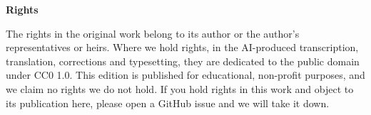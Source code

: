 \documentclass[11pt,oneside]{article}
\begin{document}
\bigskip
\noindent\textbf{Rights}

\smallskip
\noindent The rights in the original work belong to its author or the author's representatives or heirs. Where we
hold rights, in the AI-produced transcription, translation, corrections and typesetting, they are dedicated to the
public domain under CC0 1.0. This edition is published for educational, non-profit purposes, and we claim no rights we
do not hold. If you hold rights in this work and object to its publication here, please open a GitHub issue and we will
take it down.
\clearpage
\tableofcontents























\end{document}
